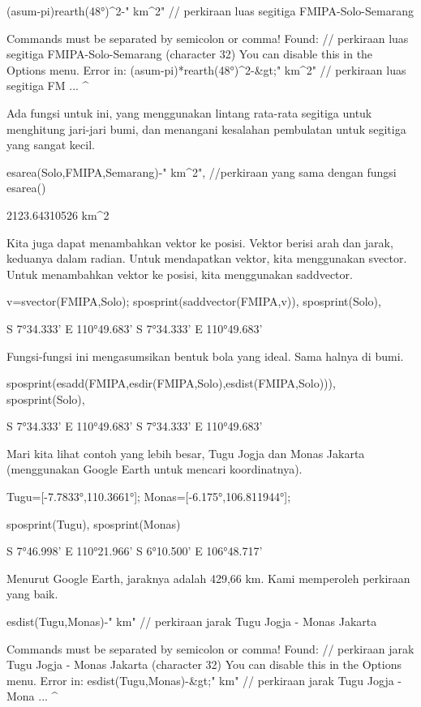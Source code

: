 \documentclass{article}
\begin{document}
\>(asum-pi)\*rearth(48°)^2-\>" km^2" // perkiraan luas segitiga FMIPA-Solo-Semarang


    Commands must be separated by semicolon or comma!
    Found:  // perkiraan luas segitiga FMIPA-Solo-Semarang (character 32)
    You can disable this in the Options menu.
    Error in:
    (asum-pi)*rearth(48°)^2-&gt;" km^2" // perkiraan luas segitiga FM ...
                                    ^

Ada fungsi untuk ini, yang menggunakan lintang rata-rata segitiga
untuk menghitung jari-jari bumi, dan menangani kesalahan pembulatan
untuk segitiga yang sangat kecil.


\>esarea(Solo,FMIPA,Semarang)-\>" km^2", //perkiraan yang sama dengan fungsi esarea()


    2123.64310526 km^2

Kita juga dapat menambahkan vektor ke posisi. Vektor berisi arah dan
jarak, keduanya dalam radian. Untuk mendapatkan vektor, kita
menggunakan svector. Untuk menambahkan vektor ke posisi, kita
menggunakan saddvector.


\>v=svector(FMIPA,Solo); sposprint(saddvector(FMIPA,v)), sposprint(Solo),


    S 7°34.333' E 110°49.683'
    S 7°34.333' E 110°49.683'

Fungsi-fungsi ini mengasumsikan bentuk bola yang ideal. Sama halnya di
bumi.


\>sposprint(esadd(FMIPA,esdir(FMIPA,Solo),esdist(FMIPA,Solo))), sposprint(Solo),


    S 7°34.333' E 110°49.683'
    S 7°34.333' E 110°49.683'

Mari kita lihat contoh yang lebih besar, Tugu Jogja dan Monas Jakarta
(menggunakan Google Earth untuk mencari koordinatnya).


\>Tugu=[-7.7833°,110.3661°]; Monas=[-6.175°,106.811944°];

\>sposprint(Tugu), sposprint(Monas)


    S 7°46.998' E 110°21.966'
    S 6°10.500' E 106°48.717'

Menurut Google Earth, jaraknya adalah 429,66 km. Kami memperoleh
perkiraan yang baik.


\>esdist(Tugu,Monas)-\>" km" // perkiraan jarak Tugu Jogja - Monas Jakarta


    Commands must be separated by semicolon or comma!
    Found:  // perkiraan jarak Tugu Jogja - Monas Jakarta (character 32)
    You can disable this in the Options menu.
    Error in:
    esdist(Tugu,Monas)-&gt;" km" // perkiraan jarak Tugu Jogja - Mona ...
                             ^
\end{document}
